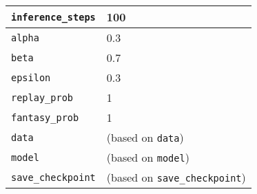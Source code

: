 \begin{table}[ht]
\begin{tabular}{|l|l|}
        \hline
        \texttt{inference\_steps} & 100 \\
        \hline
        \texttt{alpha} & 0.3 \\
        \hline
        \texttt{beta} & 0.7 \\
        \hline
        \texttt{epsilon} & 0.3 \\
        \hline
        \texttt{replay\_prob} & 1 \\
        \hline
        \texttt{fantasy\_prob} & 1 \\
        \hline
        \texttt{data} & (based on \texttt{data}) \\
        \hline
        \texttt{model} & (based on \texttt{model}) \\
        \hline
        \texttt{save\_checkpoint} & (based on \texttt{save\_checkpoint}) \\
        \hline
        \end{tabular}
        \end{table}
    